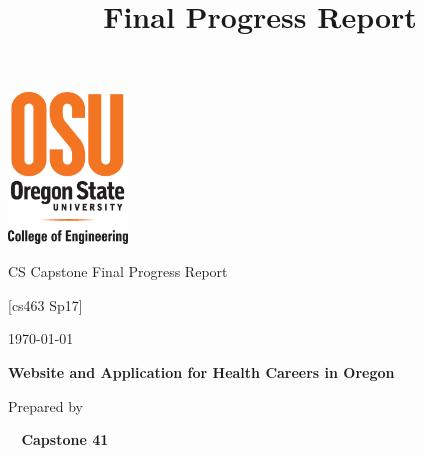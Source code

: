 \documentclass[onecolumn, draftclsnofoot,10pt, compsoc]{IEEEtran}
\title{Final Progress Report}
\def \CapstoneTeamName{		Capstone 41}
\def \CapstoneProjectName{		Website and Application for Health Careers in Oregon}
\def \DocType{	%
				Final Progress Report
				}
\begin{document}
\begin{titlepage}
    \begin{singlespace}
    	\includegraphics[height=4cm]{coe_v_spot1}
        \hfill 
        \par\vspace{.2in}
        \centering
        \scshape{
            \huge CS Capstone \DocType \par
           	\huge [cs463 Sp17] \par
            {\large\today}\par
            \vspace{.5in}
            \textbf{\Huge\CapstoneProjectName}\par
            \vspace{.5in}
           
            {\large Prepared by }\par
           
   
            \vspace{5pt}
            \textbf{\Huge\ \CapstoneTeamName}\par
            
}
\end{singlespace}
\end{titlepage}
\end{document}
